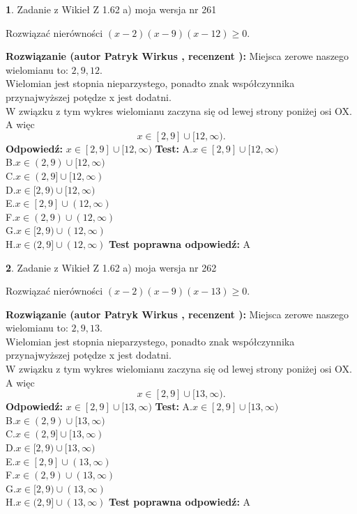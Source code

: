 \documentclass[12pt, a4paper]{article}
\theoremstyle{definition} %
\newtheorem{zad}{}
\newcommand{\zadStart}[1]{\begin{zad}#1\newline}
\newcommand{\zadStop}{\end{zad}}
\newcommand{\rozwStart}[2]{\noindent \textbf{Rozwiązanie (autor #1 , recenzent #2): }\newline}
\newcommand{\rozwStop}{\newline}
\newcommand{\odpStart}{\noindent \textbf{Odpowiedź:}\newline}
\newcommand{\odpStop}{\newline}
\newcommand{\testStart}{\noindent \textbf{Test:}\newline}
\newcommand{\testStop}{\newline}
\newcommand{\kluczStart}{\noindent \textbf{Test poprawna odpowiedź:}\newline}
\newcommand{\kluczStop}{\newline}
\begin{document}
\zadStart{Zadanie z Wikieł Z 1.62 a) moja wersja nr 261}

Rozwiązać nierówności $(x-2)(x-9)(x-12)\ge0$.
\zadStop
\rozwStart{Patryk Wirkus}{}
Miejsca zerowe naszego wielomianu to: $2, 9, 12$.\\
Wielomian jest stopnia nieparzystego, ponadto znak współczynnika przy\linebreak najwyższej potędze x jest dodatni.\\ W związku z tym wykres wielomianu zaczyna się od lewej strony poniżej osi OX. A więc $$x \in [2,9] \cup [12,\infty).$$
\rozwStop
\odpStart
$x \in [2,9] \cup [12,\infty)$
\odpStop
\testStart
A.$x \in [2,9] \cup [12,\infty)$\\
B.$x \in (2,9) \cup [12,\infty)$\\
C.$x \in (2,9] \cup [12,\infty)$\\
D.$x \in [2,9) \cup [12,\infty)$\\
E.$x \in [2,9] \cup (12,\infty)$\\
F.$x \in (2,9) \cup (12,\infty)$\\
G.$x \in [2,9) \cup (12,\infty)$\\
H.$x \in (2,9] \cup (12,\infty)$
\testStop
\kluczStart
A
\kluczStop



\zadStart{Zadanie z Wikieł Z 1.62 a) moja wersja nr 262}

Rozwiązać nierówności $(x-2)(x-9)(x-13)\ge0$.
\zadStop
\rozwStart{Patryk Wirkus}{}
Miejsca zerowe naszego wielomianu to: $2, 9, 13$.\\
Wielomian jest stopnia nieparzystego, ponadto znak współczynnika przy\linebreak najwyższej potędze x jest dodatni.\\ W związku z tym wykres wielomianu zaczyna się od lewej strony poniżej osi OX. A więc $$x \in [2,9] \cup [13,\infty).$$
\rozwStop
\odpStart
$x \in [2,9] \cup [13,\infty)$
\odpStop
\testStart
A.$x \in [2,9] \cup [13,\infty)$\\
B.$x \in (2,9) \cup [13,\infty)$\\
C.$x \in (2,9] \cup [13,\infty)$\\
D.$x \in [2,9) \cup [13,\infty)$\\
E.$x \in [2,9] \cup (13,\infty)$\\
F.$x \in (2,9) \cup (13,\infty)$\\
G.$x \in [2,9) \cup (13,\infty)$\\
H.$x \in (2,9] \cup (13,\infty)$
\testStop
\kluczStart
A
\kluczStop
\end{document}
